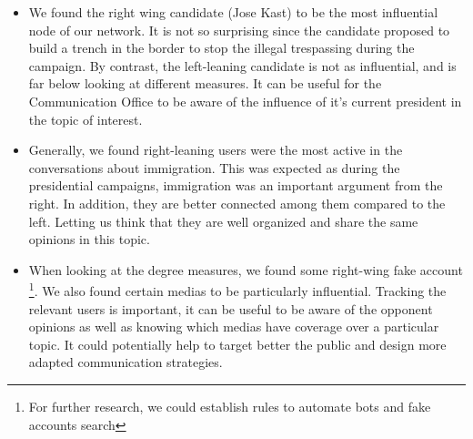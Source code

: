         \begin{itemize}
        
        \item We found the right wing candidate (Jose Kast) to be the most influential node of our network. It is not so surprising since the candidate proposed to build a trench in the border to stop the illegal trespassing during the campaign. By contrast, the left-leaning candidate is not as influential, and is far below looking at different measures. It can be useful for the Communication Office to be aware of the influence of it's current president in the topic of interest.
        
        
        \item Generally, we found right-leaning users were the most active in the conversations about immigration. This was expected as during the presidential campaigns, immigration was an important argument from the right. In addition, they are better connected among them compared to the left. Letting us think that they are well organized and share the same opinions in this topic. 
        
        \item When looking at the degree measures, we found some right-wing fake account \footnote{For further research, we could establish rules to automate bots and fake accounts search}. We also found certain medias to be particularly influential. Tracking the relevant users is important, it can be useful to be aware of the opponent opinions as well as knowing which medias have coverage over a particular topic. It could potentially help to target better the public and design more adapted communication strategies.
        
        \end{itemize}
        
        
        
                
            
            
            